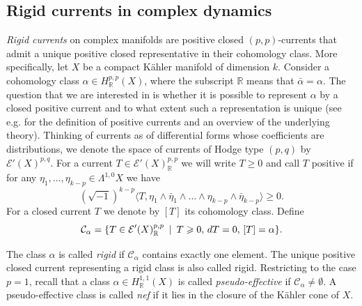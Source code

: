 \documentclass[11pt]{article}
\newcommand{\6}{\partial}
\newcommand{\bbR}{\mathbb{R}}
\newcommand{\CC}{\mathcal{C}}
\newcommand{\EE}{\mathcal{E}}
\newcommand{\PP}{\mathcal{P}}
\renewcommand{\ge}{\geqslant}
\newcommand{\st}{\enskip |\enskip}
\newcommand{\ii}{\sqrt{-1}}
\newcommand{\wdg}{\wedge}
\begin{document}
\subsection{Rigid currents in complex dynamics}

{\em Rigid currents} on complex manifolds
are positive closed $(p,p)$-currents that admit a unique
positive closed representative in their cohomology class.
More specifically, let $X$ be a compact K\"ahler manifold of dimension $k$.
Consider a cohomology class $\alpha \in H^{p,p}_\bbR(X)$, where the subscript $\bbR$
means that $\bar{\alpha} = \alpha$. The question that we are interested
in is whether it is possible to represent $\alpha$ by a closed positive current
and to what extent such a representation is unique (see e.g. \cite{Dem} for
the definition of positive currents and an overview of the underlying theory).
Thinking of currents as of differential forms whose coefficients are distributions,
we denote the space of currents of Hodge type $(p,q)$ by $\EE'(X)^{p,q}$. For
a current $T\in \EE'(X)^{p,p}_\bbR$ we will write $T\ge 0$ and call $T$ positive if 
for any $\eta_1,\ldots,\eta_{k-p}\in \Lambda^{1,0}X$ we have
$$
(\ii)^{k-p}\langle T, \eta_1\wdg\bar{\eta}_1\wdg\ldots\wdg \eta_{k-p}\wdg\bar{\eta}_{k-p}\rangle \ge 0.
$$
For a closed current $T$ we denote by $[T]$ its cohomology class. Define
$$
\CC_\alpha = \{ T\in \EE'(X)_\bbR^{p,p}\st T\ge 0,\,dT=0,\,[T]=\alpha\}.
$$

The class $\alpha$ is called {\em rigid} if $\CC_\alpha$ contains exactly one element.
The unique positive closed current representing a rigid class is also called rigid.
Restricting to the case $p=1$, recall that a class $\alpha\in H^{1,1}_\bbR(X)$ is called {\em pseudo-effective} if $\CC_\alpha \neq \emptyset$.
A pseudo-effective class is called {\em nef} if it lies in the closure of the K\"ahler cone of $X$.

\end{document}
